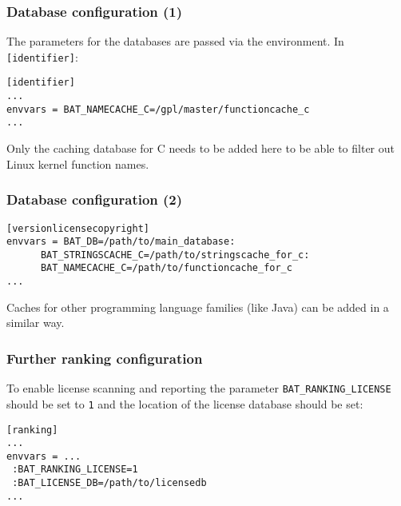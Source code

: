 \documentclass[11pt]{beamer}
\begin{document}

\begin{frame}[fragile]
\frametitle{Database configuration (1)}
The parameters for the databases are passed via the environment. In \texttt{[identifier]}:

\begin{verbatim}
[identifier]
...
envvars = BAT_NAMECACHE_C=/gpl/master/functioncache_c
...
\end{verbatim}

Only the caching database for C needs to be added here to
be able to filter out Linux kernel function names.
\end{frame}

\begin{frame}[fragile]
\frametitle{Database configuration (2)}

\begin{verbatim}
[versionlicensecopyright]
envvars = BAT_DB=/path/to/main_database:
      BAT_STRINGSCACHE_C=/path/to/stringscache_for_c:
      BAT_NAMECACHE_C=/path/to/functioncache_for_c
...
\end{verbatim}

Caches for other programming language families (like Java) can be added in a similar way.
\end{frame}

\begin{frame}[fragile]
\frametitle{Further ranking configuration}
To enable license scanning and reporting the parameter \texttt{BAT\_RANKING\_LICENSE} should be set to \texttt{1} and the location of the license database should be set:

\begin{verbatim}
[ranking]
...
envvars = ...
 :BAT_RANKING_LICENSE=1
 :BAT_LICENSE_DB=/path/to/licensedb
...
\end{verbatim}
\end{frame}

\end{document}
